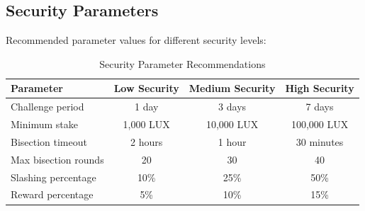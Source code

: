 \subsection{Security Parameters}

Recommended parameter values for different security levels:

\begin{table}[h]
\centering
\caption{Security Parameter Recommendations}
\begin{tabular}{lccc}
\toprule
\textbf{Parameter} & \textbf{Low Security} & \textbf{Medium Security} & \textbf{High Security} \\
\midrule
Challenge period & 1 day & 3 days & 7 days \\
Minimum stake & 1,000 LUX & 10,000 LUX & 100,000 LUX \\
Bisection timeout & 2 hours & 1 hour & 30 minutes \\
Max bisection rounds & 20 & 30 & 40 \\
Slashing percentage & 10\% & 25\% & 50\% \\
Reward percentage & 5\% & 10\% & 15\% \\
\bottomrule
\end{tabular}
\end{table}

